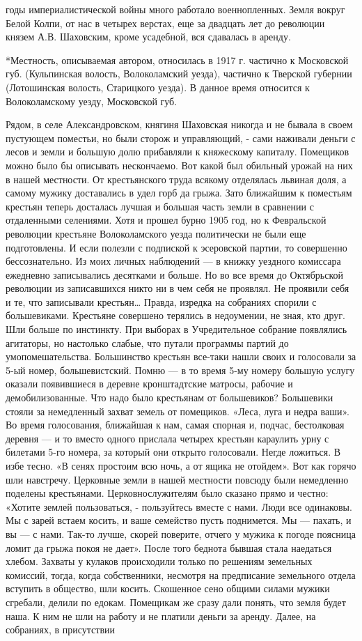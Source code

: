 годы империалистической войны много работало военнопленных. Земля вокруг Белой Колпи, от нас в четырех верстах, еще за двадцать лет до революции князем А.В. Шаховским, кроме усадебной, вся сдавалась в аренду.

*Местность, описываемая автором, относилась в 1917 г. частично к Московской губ. (Кульпинская волость, Волоколамский уезда), частично к Тверской губернии (Лотошинская волость, Старицкого уезда). В данное время относится к Волоколамскому уезду, Московской губ.

Рядом, в селе Александровском, княгиня Шаховская никогда и не бывала в своем пустующем поместьи, но были сторож и управляющий, - сами наживали деньги с лесов и земли и большую долю прибавляли к княжескому капиталу. Помещиков можно было бы описывать нескончаемо. Вот какой был обильный урожай на них в нашей местности. От крестьянского труда всякому отделялась львиная доля, а самому мужику доставались в удел горб да грыжа. Зато ближайшим к поместьям крестьян теперь досталась лучшая и большая часть земли в сравнении с отдаленными селениями. Хотя и прошел бурно 1905 год, но к Февральской революции крестьяне Волоколамского уезда политически не были еще подготовлены. И если полезли с подпиской к эсеровской партии, то совершенно бессознательно. Из моих личных наблюдений — в книжку уездного комиссара ежедневно записывались десятками и больше. Но во все время до Октябрьской революции из записавшихся никто ни в чем себя не проявлял. Не проявили себя и те, что записывали крестьян… Правда, изредка на собраниях спорили с большевиками. Крестьяне совершено терялись в недоумении, не зная, кто друг. Шли больше по инстинкту. При выборах в Учредительное собрание появлялись агитаторы, но настолько слабые, что путали программы партий до умопомешательства. Большинство крестьян все-таки нашли своих и голосовали за 5-ый номер, большевистский. Помню — в то время 5-му номеру большую услугу оказали появившиеся в деревне кронштадтские матросы, рабочие и демобилизованные. Что надо было крестьянам от большевиков? Большевики стояли за немедленный захват земель от помещиков. «Леса, луга и недра ваши». Во время голосования, ближайшая к нам, самая спорная и, подчас, бестолковая деревня — и то вместо одного прислала четырех крестьян караулить урну с билетами 5-го номера, за который они открыто голосовали. Негде ложиться. В избе тесно. «В сенях простоим всю ночь, а от ящика не отойдем». Вот как горячо шли навстречу. Церковные земли в нашей местности повсюду были немедленно поделены крестьянами. Церковнослужителям было сказано прямо и честно: «Хотите землей пользоваться, - пользуйтесь вместе с нами. Люди все одинаковы. Мы с зарей встаем косить, и ваше семейство пусть поднимется. Мы — пахать, и вы — с нами. Так-то лучше, скорей поверите, отчего у мужика к погоде поясница ломит да грыжа покоя не дает». После того беднота бывшая стала наедаться хлебом. Захваты у кулаков происходили только по решениям земельных комиссий, тогда, когда собственники, несмотря на предписание земельного отдела вступить в общество, шли косить. Скошенное сено общими силами мужики сгребали, делили по едокам. Помещикам же сразу дали понять, что земля будет наша. К ним не шли на работу и не платили деньги за аренду. Далее, на собраниях, в присутствии 